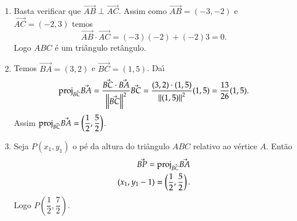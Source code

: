 \begin{exemplos}
\begin{enumerate}
\begin{solucao}
\begin{figure}[!h]

       \end{figure}
       \begin{enumerate}
         \item Basta verificar que $\vec{AB}\perp\vec{AC}$. Assim como $\vec{AB} = (-3,-2)$ e $\vec{AC} = (-2,3)$ temos
         \[
            \vec{AB}\cdot\vec{AC} = (-3)(-2) + (-2)3 = 0.
         \]
         Logo $ABC$ \'e um tri\^angulo ret\^angulo.
         \item Temos $\vec{BA} = (3,2)$ e $\vec{BC} = (1,5)$. Da{\'\i}
         \[
            {\rm proj}_{\vec{BC}}\vec{BA} = \dfrac{\vec{BC}\cdot\vec{BA}}{\left\Vert{\vec{BC}}\right\Vert^2}\vec{BC} = \dfrac{(3,2)\cdot(1,5)}{\left\Vert{(1,5)}\right\Vert^2}(1,5) = \dfrac{13}{26}(1,5).
         \]
         Assim ${\rm proj}_{\vec{BC}}\vec{BA} = \left(\dfrac{1}{2},\dfrac{5}{2}\right)$.
         \item Seja $P(x_1, y_1)$ o p\'e da altura do tri\^angulo $ABC$ relativo ao v\'ertice $A$. Ent\~ao
         \begin{align*}
           \vec{BP} = {\rm proj}_{\vec{BC}}\vec{BA}\\
           (x_1, y_1 - 1) = \left(\dfrac{1}{2}, \dfrac{5}{2}\right).
         \end{align*}
         Logo $P\left(\dfrac{1}{2},\dfrac{7}{2}\right)$.
       \end{enumerate}
     \end{solucao}
  \end{enumerate}
\end{exemplos}
